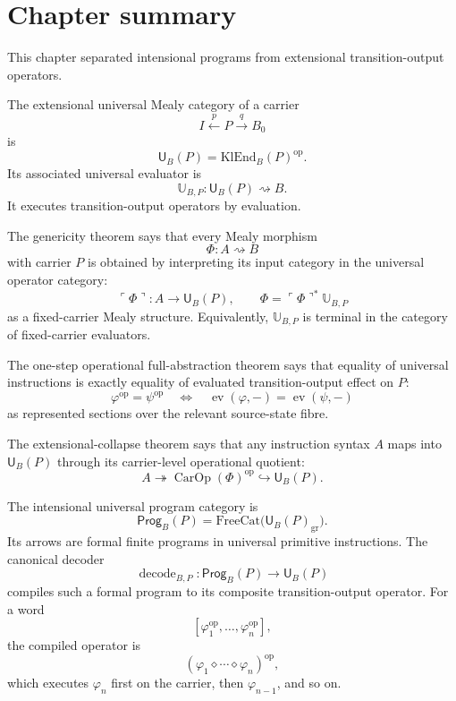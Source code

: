 \section{Chapter summary}
\label{sec:universal-mealy-summary}

This chapter separated intensional programs from extensional transition-output operators.

The extensional universal Mealy category of a carrier
\[
        I\xleftarrow{p}P\xrightarrow{q}B_0
\]
is
\[
        \mathsf U_B(P)
        =
        \mathrm{KlEnd}_B(P)^{\operatorname{op}}.
\]
Its associated universal evaluator is
\[
        \mathbb U_{B,P}:\mathsf U_B(P)\rightsquigarrow B.
\]
It executes transition-output operators by evaluation.

The genericity theorem says that every Mealy morphism
\[
        \Phi:A\rightsquigarrow B
\]
with carrier \(P\) is obtained by interpreting its input category in the universal operator
category:
\[
        \ulcorner\Phi\urcorner:A\to\mathsf U_B(P),
        \qquad
        \Phi=\ulcorner\Phi\urcorner^{\ast}\mathbb U_{B,P}
\]
as a fixed-carrier Mealy structure.  Equivalently, \(\mathbb U_{B,P}\) is terminal in the category
of fixed-carrier evaluators.

The one-step operational full-abstraction theorem says that equality of universal instructions is
exactly equality of evaluated transition-output effect on \(P\):
\[
        \varphi^{\operatorname{op}}=\psi^{\operatorname{op}}
        \quad\Longleftrightarrow\quad
        \operatorname{ev}(\varphi,-)=\operatorname{ev}(\psi,-)
\]
as represented sections over the relevant source-state fibre.

The extensional-collapse theorem says that any instruction syntax \(A\) maps into
\(\mathsf U_B(P)\) through its carrier-level operational quotient:
\[
        A
        \twoheadrightarrow
        \operatorname{CarOp}(\Phi)^{\operatorname{op}}
        \hookrightarrow
        \mathsf U_B(P).
\]

The intensional universal program category is
\[
        \mathsf{Prog}_B(P)
        =
        \mathrm{FreeCat}\bigl(\mathsf U_B(P)_{\mathrm{gr}}\bigr).
\]
Its arrows are formal finite programs in universal primitive instructions.  The canonical decoder
\[
        \operatorname{decode}_{B,P}:
        \mathsf{Prog}_B(P)\to\mathsf U_B(P)
\]
compiles such a formal program to its composite transition-output operator.  For a word
\[
        [\varphi_1^{\operatorname{op}},\ldots,\varphi_n^{\operatorname{op}}],
\]
the compiled operator is
\[
        (\varphi_1\diamond\cdots\diamond\varphi_n)^{\operatorname{op}},
\]
which executes \(\varphi_n\) first on the carrier, then \(\varphi_{n-1}\), and so on.

